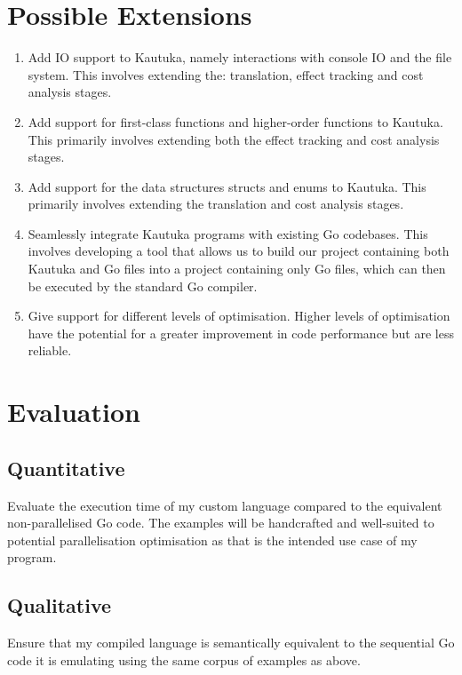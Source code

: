 \documentclass[12pt,a4paper,twoside,openright]{report}
\begin{document}
\section*{Possible Extensions}

\begin{enumerate}
  \item Add IO support to Kautuka, namely interactions with console IO and the file system. This involves extending the: translation, effect tracking and cost analysis stages.
  \item Add support for first-class functions and higher-order functions to Kautuka. This primarily involves extending both the effect tracking and cost analysis stages.
  \item Add support for the data structures structs and enums to Kautuka. This primarily involves extending the translation and cost analysis stages.
  \item Seamlessly integrate Kautuka programs with existing Go codebases. This involves developing a tool that allows us to build our project containing both Kautuka and Go files into a project containing only Go files, which can then be executed by the standard Go compiler. 
  \item Give support for different levels of optimisation. Higher levels of optimisation have the potential for a greater improvement in code performance but are less reliable.
\end{enumerate}

\newpage 

\section*{Evaluation}

\subsection*{Quantitative}
Evaluate the execution time of my custom language compared to the equivalent non-parallelised Go code. The examples will be handcrafted and well-suited to potential parallelisation optimisation as that is the intended use case of my program.

\subsection*{Qualitative}
Ensure that my compiled language is semantically equivalent to the sequential Go code it is emulating using the same corpus of examples as above.
\end{document}
